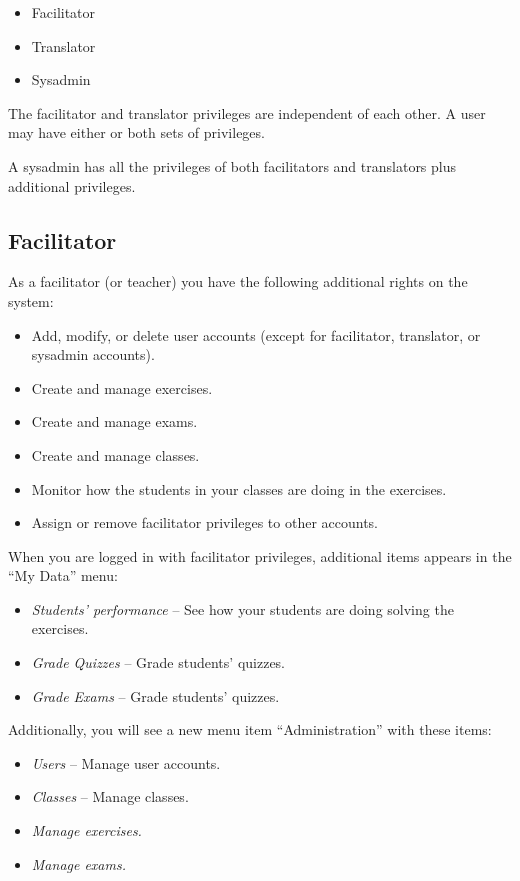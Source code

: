 \documentclass[11pt,oneside,a4paper]{memoir}
\begin{document}
\begin{itemize}
\item Facilitator
\item Translator
\item Sysadmin
\end{itemize}

The facilitator and translator privileges are independent of each other. A user may have either or
both sets of privileges.

A sysadmin has all the privileges of both facilitators and translators plus additional privileges.



\subsection{Facilitator}

As a facilitator (or teacher) you have the following additional rights on the system:

\begin{itemize}
\item Add, modify, or delete user accounts (except for facilitator, translator, or sysadmin accounts).
\item Create and manage exercises.
\item Create and manage exams.
\item Create and manage classes.
\item Monitor how the students in your classes are doing in the exercises.
\item Assign or remove facilitator privileges to other accounts.
\end{itemize}

When you are logged in with facilitator privileges, additional items appears in the ``My Data'' menu:

\begin{itemize}
\item \emph{Students' performance} -- See how your students are doing solving the exercises.
\item \emph{Grade Quizzes} -- Grade students' quizzes.
\item \emph{Grade Exams} -- Grade students' quizzes.
\end{itemize}

Additionally, you will see a new menu item ``Administration'' with these items:

\begin{itemize}
\item \emph{Users} -- Manage user accounts.
\item \emph{Classes} -- Manage classes.
\item \emph{Manage exercises.}
\item \emph{Manage exams.}
\end{itemize}
\end{document}

